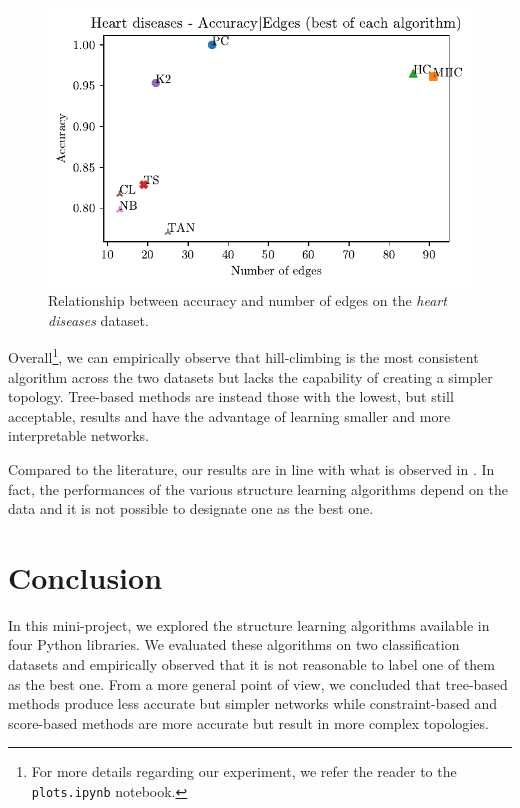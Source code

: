 \documentclass[letterpaper]{article}
\begin{document}
\begin{figure}[h]
    \centering
    \includegraphics[width=\linewidth]{img/heart_acc_edges.pdf}
    \caption{Relationship between accuracy and number of edges on the \textit{heart diseases} dataset.}
    \label{img:heart}
\end{figure}

Overall\footnote{For more details regarding our experiment, we refer the reader to the \texttt{plots.ipynb} notebook.}, 
we can empirically observe that hill-climbing is the most consistent algorithm
across the two datasets but lacks the capability of creating a simpler topology.
Tree-based methods are instead those with the lowest, but still acceptable, results and 
have the advantage of learning smaller and more interpretable networks.

Compared to the literature, our results are in line with what is observed in \cite{learning_comparison_2021}.
In fact, the performances of the various structure learning algorithms depend on the data and 
it is not possible to designate one as the best one.






\section{Conclusion}

In this mini-project, we explored the structure learning algorithms available in four Python libraries.
We evaluated these algorithms on two classification datasets and 
empirically observed that it is not reasonable to label one of them as the best one.
From a more general point of view, we concluded that tree-based methods produce less accurate but simpler networks
while constraint-based and score-based methods are more accurate but result in more complex topologies.
\end{document}
